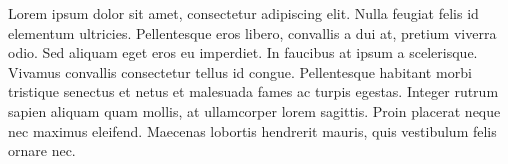 Lorem ipsum dolor sit amet, consectetur adipiscing elit. Nulla feugiat felis id elementum ultricies. Pellentesque eros libero, convallis a dui at, pretium viverra odio. Sed aliquam eget eros eu imperdiet. In faucibus at ipsum a scelerisque. Vivamus convallis consectetur tellus id congue. Pellentesque habitant morbi tristique senectus et netus et malesuada fames ac turpis egestas. Integer rutrum sapien aliquam quam mollis, at ullamcorper lorem sagittis. Proin placerat neque nec maximus eleifend. Maecenas lobortis hendrerit mauris, quis vestibulum felis ornare nec. 